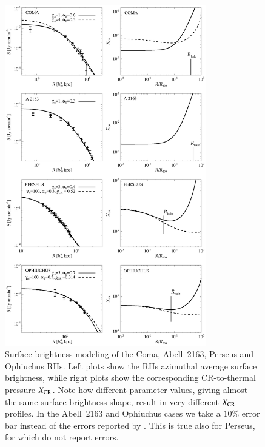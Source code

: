 \documentclass[traditabstract]{aa}
\begin{document}
\begin{figure}[hbt!]
\centering
\includegraphics[width=0.78\textwidth]{figures/SB_profiles_ALL.eps}
\caption{Surface brightness modeling of the Coma, Abell~2163, Perseus and Ophiuchus RHs. Left plots show the RHs azimuthal average surface brightness, while right plots show the corresponding CR-to-thermal pressure $X_{\rm{CR}}$. Note how different parameter values, giving almost the same surface brightness shape, result in very different $X_{\rm{CR}}$ profiles. In the Abell~2163 and Ophiuchus cases we take a $10\%$ error bar instead of the errors reported by \cite{2009A&A...499..679M}. This is true also for Perseus, for which \cite{1990MNRAS.246..477P} do not report errors.}
\label{fig:SBmodeling}
\end{figure}
\end{document}

